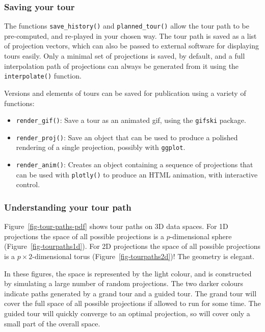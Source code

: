 \documentclass[
  letterpaper,
]{krantz}
\providecommand{\tightlist}{%
  \setlength{\itemsep}{0pt}\setlength{\parskip}{0pt}}
\begin{document}
\subsubsection{Saving your tour}\label{saving-your-tour}

The functions \texttt{save\_history()} and \texttt{planned\_tour()}
allow the tour path to be pre-computed, and re-played in your chosen
way. The tour path is saved as a list of projection vectors, which can
also be passed to external software for displaying tours easily. Only a
minimal set of projections is saved, by default, and a full
interpolation path of projections can always be generated from it using
the \texttt{interpolate()} function.

Versions and elements of tours can be saved for publication using a
variety of functions:

\begin{itemize}
\tightlist
\item
  \texttt{render\_gif()}: Save a tour as an animated gif, using the
  \texttt{gifski} package.
\item
  \texttt{render\_proj()}: Save an object that can be used to produce a
  polished rendering of a single projection, possibly with
  \texttt{ggplot}.
\item
  \texttt{render\_anim()}: Creates an object containing a sequence of
  projections that can be used with \texttt{plotly()} to produce an HTML
  animation, with interactive control.
\end{itemize}

\subsubsection{Understanding your tour
path}\label{understanding-your-tour-path}

Figure~\ref{fig-tour-paths-pdf} shows tour paths on 3D data spaces. For
1D projections the space of all possible projections is a
\(p\)-dimensional sphere (Figure~\ref{fig-tourpaths1d}). For 2D
projections the space of all possible projections is a
\(p\times 2\)-dimensional torus (Figure~\ref{fig-tourpaths2d})! The
geometry is elegant.

In these figures, the space is represented by the light colour, and is
constructed by simulating a large number of random projections. The two
darker colours indicate paths generated by a grand tour and a guided
tour. The grand tour will cover the full space of all possible
projections if allowed to run for some time. The guided tour will
quickly converge to an optimal projection, so will cover only a small
part of the overall space.
\end{document}
